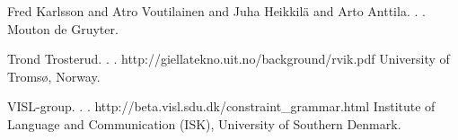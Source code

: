 \documentclass[11pt]{article}
\begin{document}
\begin{thebibliography}{}
{Fred Karlsson and Atro Voutilainen and Juha Heikkilä and Arto Anttila}.
.
.
\newblock Mouton de Gruyter.




{Trond Trosterud}.
.
.
\newblock http://giellatekno.uit.no/background/rvik.pdf
\newblock University of Tromsø, Norway.

{VISL-group}.
.
.
\newblock http://beta.visl.sdu.dk/constraint\_grammar.html
\newblock Institute of Language and Communication (ISK), University of Southern Denmark.


\end{thebibliography}


%
%



	
\end{document}
